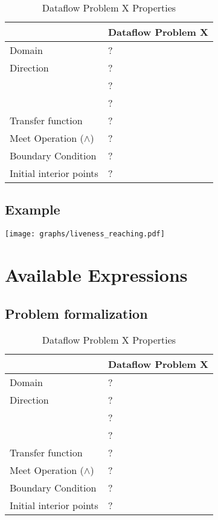 \documentclass{article}
\begin{document}
\begin{table}[H]
\centering
\begin{tabular}{|p{}|p{}|}
\hline
 & \textbf{Dataflow Problem X} \\
\hline
Domain & ? \\
\hline
Direction & ? \\
 & ? \\
 & ? \\
\hline
Transfer function & ? \\
\hline
Meet Operation ($\wedge$) & ? \\
\hline
Boundary Condition & ? \\
\hline
Initial interior points & ? \\
\hline
\end{tabular}
\caption{Dataflow Problem X Properties}
\label{tab:dataflow_problem_x}
\end{table}

\subsection{Example}

\texttt{[image: graphs/liveness\_reaching.pdf]}

\section{Available Expressions}

\subsection{Problem formalization}

\begin{table}[H]
\centering
\begin{tabular}{|p{}|p{}|}
\hline
 & \textbf{Dataflow Problem X} \\
\hline
Domain & ? \\
\hline
Direction & ? \\
 & ? \\
 & ? \\
\hline
Transfer function & ? \\
\hline
Meet Operation ($\wedge$) & ? \\
\hline
Boundary Condition & ? \\
\hline
Initial interior points & ? \\
\hline
\end{tabular}
\caption{Dataflow Problem X Properties}
\label{tab:dataflow_problem_x}
\end{table}
\end{document}

